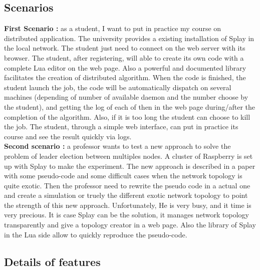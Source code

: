 \documentclass{eplmastersthesis}
\begin{document}
      \subsection{Scenarios}

        \textbf{First Scenario : } as a student, I want to put in practice my course on distributed application. The university provides a existing installation of Splay in the local network. The student just need to connect on the web server with its browser. The student, after registering, will able to create its own code with a complete Lua editor on the web page. Also a powerful and documented library facilitates the creation of distributed algorithm. When the code is finished, the student launch the job, the code will be automatically dispatch on several machines (depending of number of available daemon and the number choose by the student), and getting the log of each of then in the web page during/after the completion of the algorithm. Also, if it is too long the student can choose to kill the job. The student, through a simple web interface, can put in practice its course and see the result quickly via logs.\\

    	\textbf{Second scenario : } a professor wants to test a new approach to solve the problem of leader election between multiples nodes. A cluster of Raspberry is set up with Splay to make the experiment. The new approach is described in a paper with some pseudo-code and some difficult cases when the network topology is quite exotic. Then the professor need to rewrite the pseudo code in a actual one and create a simulation or truely the different exotic network topology to point the strength of this new approach. Unfortunately, He is very busy, and it time is very precious. It is case Splay can be the solution, it manages network topology transparently and give a topology creator in a web page. Also the library of Splay in the Lua side allow to quickly reproduce the pseudo-code.



\subsection{Details of features}
\end{document}
